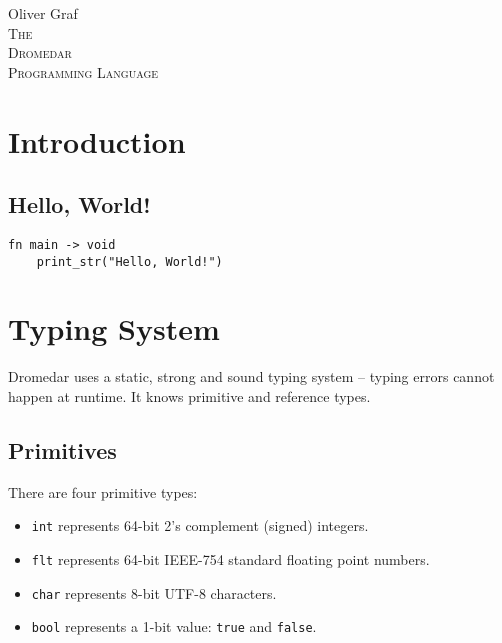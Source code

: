 \documentclass{article}
\newcommand{\code}[1]{\lstinline[columns=fixed]{#1}}
\begin{document}
	
	\vfill
	\begin{center}
		\large{Oliver Graf}\\
		\vspace{5cm}
		\large{\textsc{The}}\\\vspace{1cm}
		\Huge{\textsc{Dromedar}}\\\vspace{1cm}
		\large{\textsc{Programming Language}}
	\end{center}
	\vfill
	
	\clearpage
	
	\setcounter{tocdepth}{1}
	\tableofcontents
	\clearpage
	
	\section{Introduction}
	
		\subsection{Hello, World!}
		
			\begin{lstlisting}
fn main -> void
	print_str("Hello, World!")
			\end{lstlisting}
	
	\section{Typing System}
	
		Dromedar uses a static, strong and sound typing system -- typing errors cannot happen at runtime. It knows primitive and reference types.
		
		\subsection{Primitives}
		
			There are four primitive types:
			
			\begin{itemize}
				\item \code{int} represents 64-bit 2's complement (signed) integers.
				\item \code{flt} represents 64-bit IEEE-754 standard floating point numbers.
				\item \code{char} represents 8-bit UTF-8 characters.
				\item \code{bool} represents a 1-bit value: \code{true} and \code{false}.
			\end{itemize}
		
\end{document}
